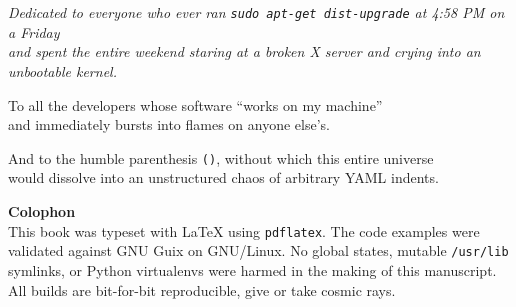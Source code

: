 \chapter*{}
\vspace*{5cm}

\begin{center}
\itshape
Dedicated to everyone who ever ran \texttt{sudo apt-get dist-upgrade} at 4:58 PM on a Friday\\
and spent the entire weekend staring at a broken X server and crying into an unbootable kernel.

\vspace{1.5cm}

To all the developers whose software ``works on my machine''\\
and immediately bursts into flames on anyone else's.

\vspace{1.5cm}

And to the humble parenthesis \texttt{()}, without which this entire universe\\
would dissolve into an unstructured chaos of arbitrary YAML indents.
\end{center}

\vfill

\noindent
\textbf{Colophon}\\
\small\color{commentgray}
This book was typeset with \LaTeX{} using \texttt{pdflatex}. The code examples were validated against GNU Guix on GNU/Linux. No global states, mutable \texttt{/usr/lib} symlinks, or Python virtualenvs were harmed in the making of this manuscript. All builds are bit-for-bit reproducible, give or take cosmic rays.

\cleardoublepage
